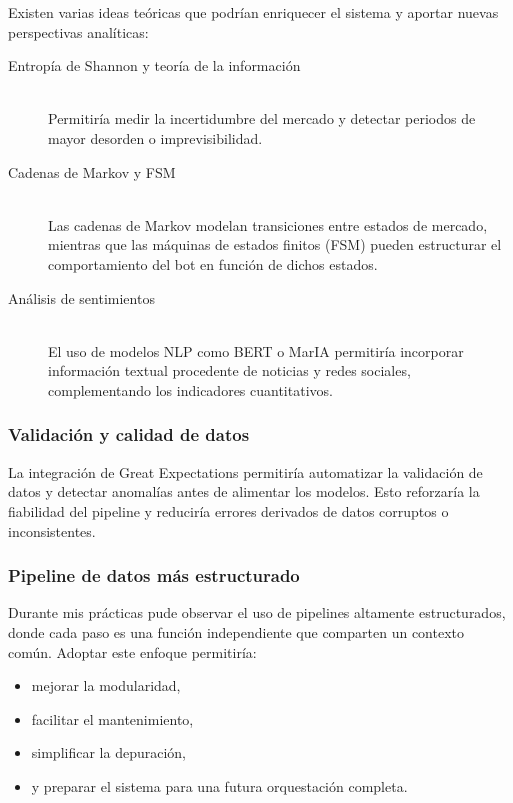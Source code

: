 Existen varias ideas teóricas que podrían enriquecer el sistema y aportar nuevas perspectivas analíticas:

\begin{description}
\item[Entropía de Shannon y teoría de la información] \hfill \\
Permitiría medir la incertidumbre del mercado y detectar periodos de mayor desorden o imprevisibilidad.
\item[Cadenas de Markov y FSM] \hfill \\
Las cadenas de Markov modelan transiciones entre estados de mercado, mientras que las máquinas de estados finitos (FSM) pueden estructurar el comportamiento del bot en función de dichos estados.
\item[Análisis de sentimientos] \hfill \\
El uso de modelos NLP como BERT o MarIA permitiría incorporar información textual procedente de noticias y redes sociales, complementando los indicadores cuantitativos.
\end{description}

\subsubsection{Validación y calidad de datos}

La integración de Great Expectations permitiría automatizar la validación de datos y detectar anomalías antes de alimentar los modelos. Esto
reforzaría la fiabilidad del pipeline y reduciría errores derivados de datos corruptos o inconsistentes.

\subsubsection{Pipeline de datos más estructurado}

Durante mis prácticas pude observar el uso de pipelines altamente estructurados, donde cada paso es una función independiente que comparten un
contexto común. Adoptar este enfoque permitiría:

\begin{itemize}
    \item mejorar la modularidad,
    \item facilitar el mantenimiento,
    \item simplificar la depuración,
    \item y preparar el sistema para una futura orquestación completa.
\end{itemize}

